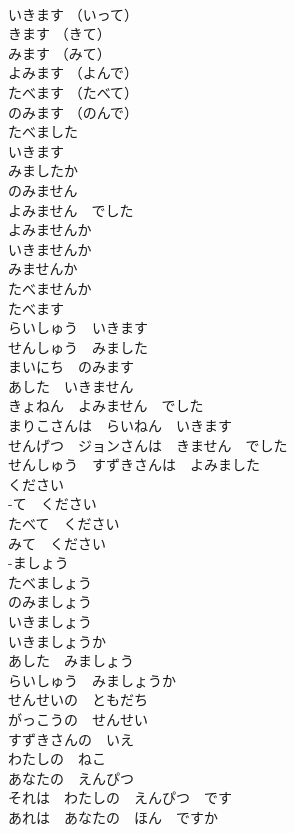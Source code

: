 \documentclass[8pt]{extreport}
\begin{document}
\begin{CJK}{UTF8}{min}
\\	いきます （いって）	
\\	きます （きて）	
\\	みます （みて）	
\\	よみます （よんで）	
\\	たべます （たべて）	
\\	のみます （のんで）	
\\	たべました	
\\	いきます	
\\	みましたか	
\\	のみません	
\\	よみません　でした	
\\	よみませんか	
\\	いきませんか	
\\	みませんか	
\\	たべませんか	
\\	たべます	
\\	らいしゅう　いきます	
\\	せんしゅう　みました	
\\	まいにち　のみます	
\\	あした　いきません	
\\	きょねん　よみません　でした	
\\	まりこさんは　らいねん　いきます	
\\	せんげつ　ジョンさんは　きません　でした	
\\	せんしゅう　すずきさんは　よみました	
\\	ください	
\\	-て　ください	
\\	たべて　ください	
\\	みて　ください	
\\	-ましょう	
\\	たべましょう	
\\	のみましょう	
\\	いきましょう	
\\	いきましょうか	
\\	あした　みましょう	
\\	らいしゅう　みましょうか	
\\	せんせいの　ともだち	
\\	がっこうの　せんせい	
\\	すずきさんの　いえ	
\\	わたしの　ねこ	
\\	あなたの　えんぴつ	
\\	それは　わたしの　えんぴつ　です	
\\	あれは　あなたの　ほん　ですか	

\end{CJK}
\end{document}
